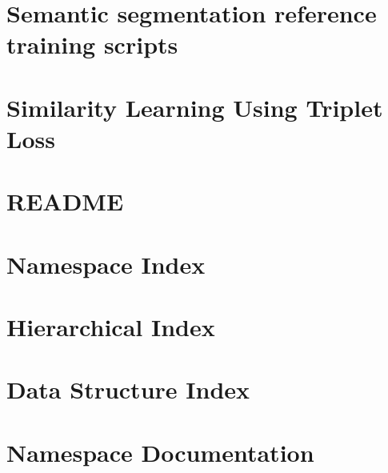 \documentclass[twoside]{book}
\newcommand{\+}{\discretionary{\mbox{\scriptsize$\hookleftarrow$}}{}{}}
\begin{document}
\chapter{Semantic segmentation reference training scripts}
\label{md__home_jose_ros_ws_src_gr_perception_gr_ml_nb_vision_references_segmentation_README}

\chapter{Similarity Learning Using Triplet Loss}
\label{md__home_jose_ros_ws_src_gr_perception_gr_ml_nb_vision_references_similarity_README}

\chapter{R\+E\+A\+D\+ME}
\label{md__home_jose_ros_ws_src_gr_perception_gr_ml_nb_yolov3_README}

\chapter{Namespace Index}

\chapter{Hierarchical Index}

\chapter{Data Structure Index}

\chapter{Namespace Documentation}






\end{document}

